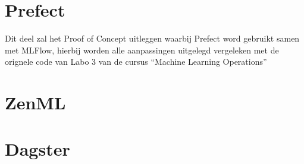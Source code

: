 \section*{Prefect}
Dit deel zal het Proof of Concept uitleggen waarbij Prefect word gebruikt samen met MLFlow, hierbij worden alle aanpassingen uitgelegd vergeleken met de orignele code van Labo 3 van de cursus ``Machine Learning Operations''
\section*{ZenML}
\section*{Dagster}



